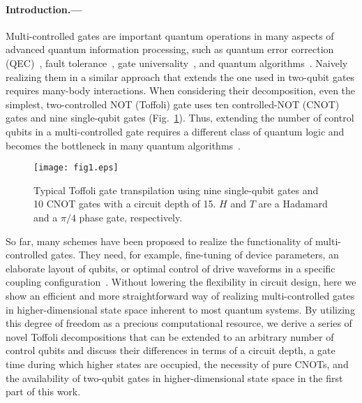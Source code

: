 \documentclass[aps,prl,twocolumn,groupedaddress,superscriptaddress]{revtex4}
\begin{document}
\paragraph{Introduction.---}
Multi-controlled gates are important quantum operations in many aspects of advanced quantum information processing, such as quantum error correction (QEC)~\cite{preskill2018quantum,shor1995,calderbank1996good,terhal2015quantum}, fault tolerance~\cite{jones2013ft-toffoli,paetznick2013,yoder2016}, gate universality~\cite{shi2003,aharonov2003}, and quantum algorithms~\cite{shor1999polynomial,grover1997,hner2017}.
Naively realizing them in a similar approach that extends the one used in two-qubit gates requires many-body interactions.
When considering their decomposition, even the simplest, two-controlled NOT (Toffoli) gate uses ten controlled-NOT (CNOT) gates and nine single-qubit gates (Fig.~\ref{fig1}).
Thus, extending the number of control qubits in a multi-controlled gate requires a different class of quantum logic and becomes the bottleneck in many quantum algorithms~\cite{shor1999polynomial,grover1997,hner2017,childs2010,montanaro2016,mcardle2020}.

\begin{figure}[b]
\vspace{+2mm}
\texttt{[image: fig1.eps]}
\caption{
Typical Toffoli gate transpilation using nine single-qubit gates and 10 CNOT gates with a circuit depth of 15.
$H$ and $T$ are a Hadamard and a $\pi /4$ phase gate, respectively.
\label{fig1}}
\end{figure}

So far, many schemes have been proposed to realize the functionality of multi-controlled gates.
They need, for example, fine-tuning of device parameters, an elaborate layout of qubits, or optimal control of drive waveforms in a specific coupling configuration~\cite{banchi2016,rasmussen2020,stojanovic2012,zahedinejad2015}.
Without lowering the flexibility in circuit design, here we show an efficient and more straightforward way of realizing multi-controlled gates in higher-dimensional state space inherent to most quantum systems.
By utilizing this degree of freedom as a precious computational resource, we derive a series of novel Toffoli decompositions that can be extended to an arbitrary number of control qubits and discuss their differences in terms of a circuit depth, a gate time during which higher states are occupied, the necessity of pure CNOTs, and the availability of two-qubit gates in higher-dimensional state space in the first part of this work.
\end{document}
